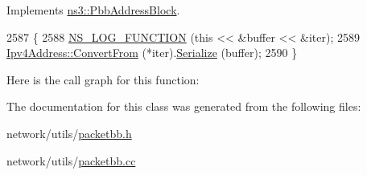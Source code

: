 Implements \hyperlink{classns3_1_1PbbAddressBlock_a53207832167cad2ee8a7783f318c44aa}{ns3\+::\+Pbb\+Address\+Block}.


\begin{DoxyCode}
2587 \{
2588   \hyperlink{log-macros-disabled_8h_a90b90d5bad1f39cb1b64923ea94c0761}{NS\_LOG\_FUNCTION} (\textcolor{keyword}{this} << &buffer << &iter);
2589   \hyperlink{classns3_1_1Ipv4Address_a5fd4a8f0f7bb75e35dad3d401ef4cbc1}{Ipv4Address::ConvertFrom} (*iter).\hyperlink{classns3_1_1Ipv4Address_afa8e7c9d7347c91dfcf5dab3f4a71a2b}{Serialize} (buffer);
2590 \}
\end{DoxyCode}


Here is the call graph for this function\+:




The documentation for this class was generated from the following files\+:\begin{DoxyCompactItemize}
\item 
network/utils/\hyperlink{packetbb_8h}{packetbb.\+h}\item 
network/utils/\hyperlink{packetbb_8cc}{packetbb.\+cc}\end{DoxyCompactItemize}
